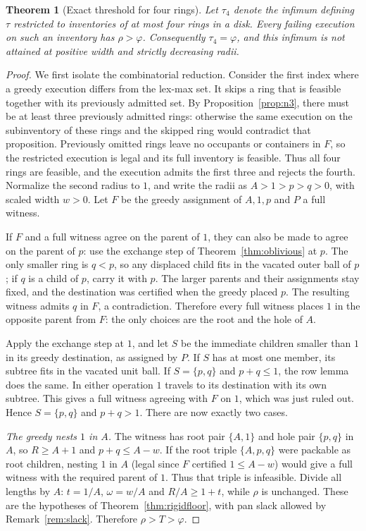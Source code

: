 \documentclass[11pt]{article}
\newtheorem{theorem}{Theorem}
\theoremstyle{definition}
\begin{document}
\begin{theorem}[Exact threshold for four rings]\label{thm:fourfloor}
Let $\tau_4$ denote the infimum defining $\tau$ restricted to inventories
of at most four rings in a disk. Every failing execution on such an
inventory has $\rho>\varphi$. Consequently $\tau_4=\varphi$, and this
infimum is not attained at positive width and strictly decreasing radii.
\end{theorem}
\begin{proof}
We first isolate the combinatorial reduction. Consider the first index
where a greedy execution differs from the lex-max set. It skips a ring
that is feasible together with its previously admitted set. By
Proposition~\ref{prop:n3}, there must be at least three previously
admitted rings: otherwise the same execution on the subinventory of
these rings and the skipped ring would contradict that proposition.
Previously omitted rings leave no occupants or containers in $F$,
so the restricted execution is legal and its full inventory is feasible.
Thus all four rings are feasible, and the execution admits the first
three and rejects the fourth. Normalize the second radius to $1$,
and write the radii as $A>1>p>q>0$, with scaled width $w>0$.
Let $F$ be the greedy assignment of $A,1,p$ and $P$ a full witness.

If $F$ and a full witness agree on the parent of $1$, they can also
be made to agree on the parent of $p$: use the exchange step of
Theorem~\ref{thm:oblivious} at $p$. The only smaller ring is $q<p$,
so any displaced child fits in the vacated outer ball of $p$;
if $q$ is a child of $p$, carry it with $p$. The larger parents and
their assignments stay fixed, and the destination was certified
when the greedy placed $p$. The resulting witness admits $q$ in
$F$, a contradiction. Therefore every full witness places $1$
in the opposite parent from $F$: the only choices are the root and
the hole of $A$.

Apply the exchange step at $1$, and let $S$ be the immediate
children smaller than $1$ in its greedy destination, as assigned by
$P$. If $S$ has at most one member, its subtree fits in the vacated
unit ball. If $S=\{p,q\}$ and $p+q\le1$, the row lemma does the
same. In either operation $1$ travels to its destination with its
own subtree. This gives a full witness agreeing with $F$ on
$1$, which was just ruled out. Hence $S=\{p,q\}$ and $p+q>1$.
There are now exactly two cases.

\emph{The greedy nests $1$ in $A$.} The witness has root pair
$\{A,1\}$ and hole pair $\{p,q\}$ in $A$, so
$R\ge A+1$ and $p+q\le A-w$. If the root triple $\{A,p,q\}$
were packable as root children, nesting $1$ in $A$ (legal since
$F$ certified $1\le A-w$) would give a full witness with
the required parent of $1$. Thus that triple is infeasible.
Divide all lengths by $A$: $t=1/A$, $\omega=w/A$ and
$R/A\ge1+t$, while $\rho$ is unchanged. These are the hypotheses of
Theorem~\ref{thm:rigidfloor}, with pan slack allowed by
Remark~\ref{rem:slack}. Therefore $\rho>T>\varphi$.


\end{proof}
\end{document}
